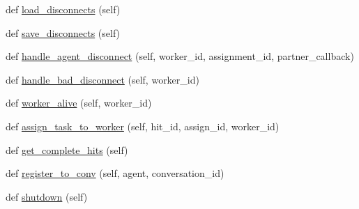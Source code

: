 \begin{DoxyCompactItemize}
\item 
def \hyperlink{classparlai_1_1mturk_1_1core_1_1dev_1_1worker__manager_1_1WorkerManager_a1d1185d97ee3a467a33a1872a316ea2d}{load\+\_\+disconnects} (self)
\item 
def \hyperlink{classparlai_1_1mturk_1_1core_1_1dev_1_1worker__manager_1_1WorkerManager_a4ef70d1871be031e2260ac6948fd3dba}{save\+\_\+disconnects} (self)
\item 
def \hyperlink{classparlai_1_1mturk_1_1core_1_1dev_1_1worker__manager_1_1WorkerManager_aaeb48ce35a7793d501d2a317ea225526}{handle\+\_\+agent\+\_\+disconnect} (self, worker\+\_\+id, assignment\+\_\+id, partner\+\_\+callback)
\item 
def \hyperlink{classparlai_1_1mturk_1_1core_1_1dev_1_1worker__manager_1_1WorkerManager_ae527be446b326d4252304cf89850aff8}{handle\+\_\+bad\+\_\+disconnect} (self, worker\+\_\+id)
\item 
def \hyperlink{classparlai_1_1mturk_1_1core_1_1dev_1_1worker__manager_1_1WorkerManager_a4ac41d78677e2ad337be38ee4d68cea3}{worker\+\_\+alive} (self, worker\+\_\+id)
\item 
def \hyperlink{classparlai_1_1mturk_1_1core_1_1dev_1_1worker__manager_1_1WorkerManager_a35537f12dc64b0fe56c1b685b31b639f}{assign\+\_\+task\+\_\+to\+\_\+worker} (self, hit\+\_\+id, assign\+\_\+id, worker\+\_\+id)
\item 
def \hyperlink{classparlai_1_1mturk_1_1core_1_1dev_1_1worker__manager_1_1WorkerManager_a21d7624c63aa1e6540db8d551a1744d2}{get\+\_\+complete\+\_\+hits} (self)
\item 
def \hyperlink{classparlai_1_1mturk_1_1core_1_1dev_1_1worker__manager_1_1WorkerManager_adf9deaf97b2ffe6600f2cf6ec9bc3232}{register\+\_\+to\+\_\+conv} (self, agent, conversation\+\_\+id)
\item 
def \hyperlink{classparlai_1_1mturk_1_1core_1_1dev_1_1worker__manager_1_1WorkerManager_af1fe1df324e27042479dbc71d6565e57}{shutdown} (self)
\end{DoxyCompactItemize}
